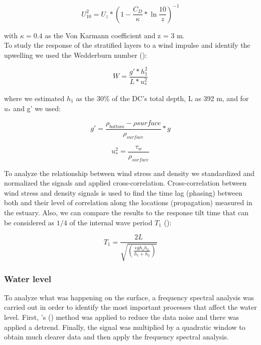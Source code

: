 \documentclass[11pt,letterpaper]{article}
\begin{document}
\begin{equation}
    U_{10}^2=U_z*(1-\frac{C_D}{\kappa}*\ln{\frac{10}{z}})^{-1}
    \label{eq: adjvel}
\end{equation}

with $\kappa=0.4$ as the Von Karmann coefficient and z = 3 m.\\

To study the response of the stratified layers to a wind impulse and identify the upwelling we used the Wedderburn number (\cite{Shintani2010}):

\begin{equation}
    W=\frac{g'*h_1^2}{L*u_*^2}
    \label{eq: wed}
\end{equation}

where we estimated $h_1$ as the 30\% of the DC's total depth, L as 392 m, and for $u_*$ and g' we used:

\begin{equation}
    g'=\frac{\rho_{bottom}-\rho{surface}}{\rho_{surface}}*g
    \label{eq: redg}
\end{equation}

\begin{equation}
    u_*^2=\frac{\tau_w}{\rho_{surface}}
    \label{eq: ustar}
\end{equation}


To analyze the relationship between wind stress and density we standardized and normalized the signals and applied cross-correlation. Cross-correlation between wind stress and density signals is used to find the time lag (phasing) between both and their level of correlation along the locations (propagation) measured in the estuary. Also, we can compare the results to the response tilt time that can be considered as $1/4$ of the internal wave period $T_1$ (\cite{stevens1996initial}): 

\begin{equation}
    T_1=\frac{2L}{\sqrt{(\frac{\epsilon g h_1 h_2}{h_1 + h_2})}}
    \label{eq: period}
\end{equation}

\subsubsection{Water level}

To analyze what was happening on the surface, a frequency spectral analysis was carried out in order to identify the most important processes that affect the water level. First, \citeauthor{welch1967use}'s (\cite*{welch1967use}) method was applied to reduce the data noise and there was applied a detrend. Finally, the signal was multiplied by a quadratic window to obtain much clearer data and then apply the frequency spectral analysis. \\
\end{document}
